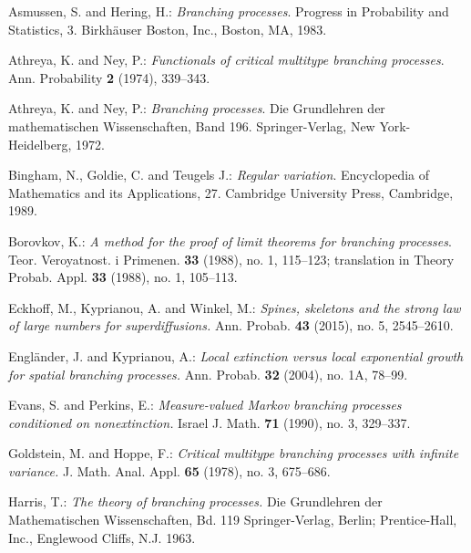 \documentclass[12pt,a4paper]{amsart}
\theoremstyle{definition}
\numberwithin{equation}{section}
\begin{document}
\begin{thebibliography}{10}
	
	Asmussen, S. and Hering, H.:
	\emph{Branching processes}.
	Progress in Probability and Statistics, 3.
	Birkh{\"a}user Boston, Inc., Boston, MA, 1983.
	
	
	Athreya, K. and Ney, P.:
	\emph{Functionals of critical multitype branching processes}.
	Ann. Probability \textbf{2} (1974), 339--343.


	
	Athreya, K. and Ney, P.:
	\emph{Branching processes}.
	Die Grundlehren der mathematischen Wissenschaften, Band 196.
	Springer-Verlag, New York-Heidelberg, 1972.
	
	
	Bingham, N., Goldie, C. and Teugels J.:
	\emph{Regular variation}.
	Encyclopedia of Mathematics and its Applications, 27.
	Cambridge University Press, Cambridge, 1989.
	
	
	Borovkov, K.:
	\emph{A method for the proof of limit theorems for branching processes}.
	Teor. Veroyatnost. i Primenen. \textbf{33} (1988), no. 1, 115--123;
	translation in Theory Probab. Appl. \textbf{33} (1988), no. 1, 105–113.
	
	
	Eckhoff, M., Kyprianou, A. and Winkel, M.:
	\emph{Spines, skeletons and the strong law of large numbers for superdiffusions.}
	Ann. Probab. \textbf{43} (2015), no. 5, 2545–2610.
	
	
	Engl\"{a}nder, J. and Kyprianou, A.:
	\emph{Local extinction versus local exponential growth for spatial branching processes.}
	Ann. Probab. \textbf{32} (2004), no. 1A, 78–99.
	
	
	Evans, S. and Perkins, E.:
	\emph{Measure-valued Markov branching processes conditioned on nonextinction.}
	Israel J. Math. \textbf{71} (1990), no. 3, 329–337.

	
	Goldstein, M. and Hoppe, F.:
	\emph{Critical multitype branching processes with infinite variance.}
	J. Math. Anal. Appl. \textbf{65} (1978), no. 3, 675–686.
	
	
	Harris, T.:
	\emph{The theory of branching processes.}
	Die Grundlehren der Mathematischen Wissenschaften, Bd. 119 Springer-Verlag, Berlin; Prentice-Hall, Inc., Englewood Cliffs, N.J. 1963.
	

\end{thebibliography}
\end{document}

